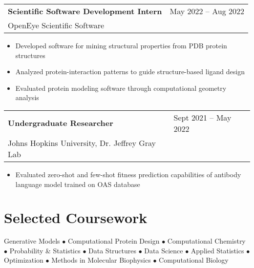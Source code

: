 \documentclass[11pt, a4paper]{article}
\makeatletter
\newcommand{\datewidth}{1.5in}
\newcommand{\position}[4]{%
    \noindent\begin{tabular}{@{}p{\dimexpr\textwidth-\datewidth}p{\datewidth}@{}}
    \textbf{#1} & #2\\
    #3 &\\
    \end{tabular}
    #4
    \vspace{1.2em}
}
\makeatother
\begin{document}
\position{Scientific Software Development Intern}{May 2022 -- Aug 2022}{OpenEye Scientific Software}{
\begin{itemize}[leftmargin=*,nosep,itemsep=2pt]
    \item Developed software for mining structural properties from PDB protein structures
    \item Analyzed protein-interaction patterns to guide structure-based ligand design
    \item Evaluated protein modeling software through computational geometry analysis
\end{itemize}}

\position{Undergraduate Researcher}{Sept 2021 -- May 2022}{Johns Hopkins University, Dr. Jeffrey Gray Lab}{
\begin{itemize}[leftmargin=*,nosep,itemsep=2pt]
    \item Evaluated zero-shot and few-shot fitness prediction capabilities of antibody language model trained on OAS database
\end{itemize}}

\section{Selected Coursework}
Generative Models $\bullet$ Computational Protein Design $\bullet$ Computational Chemistry $\bullet$ Probability \& Statistics $\bullet$ Data Structures $\bullet$ Data Science $\bullet$ Applied Statistics $\bullet$ Optimization $\bullet$ Methods in Molecular Biophysics $\bullet$ Computational Biology 
\end{document}
